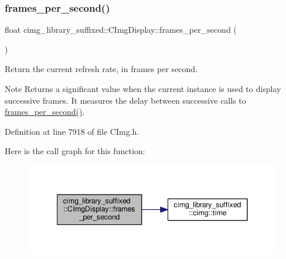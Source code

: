 \mbox{\label{structcimg__library__suffixed_1_1CImgDisplay_ac98fc29fc303ea835a630ab2253cb7b4}} 
\subsubsection{\texorpdfstring{frames\+\_\+per\+\_\+second()}{frames\_per\_second()}}
{\footnotesize\ttfamily float cimg\+\_\+library\+\_\+suffixed\+::\+C\+Img\+Display\+::frames\+\_\+per\+\_\+second (\begin{DoxyParamCaption}{ }\end{DoxyParamCaption})\hspace{0.3cm}{\ttfamily [inline]}}



Return the current refresh rate, in frames per second. 

\begin{DoxyNote}{Note}
Returns a significant value when the current instance is used to display successive frames. It measures the delay between successive calls to \hyperlink{structcimg__library__suffixed_1_1CImgDisplay_ac98fc29fc303ea835a630ab2253cb7b4}{frames\+\_\+per\+\_\+second()}. 
\end{DoxyNote}


Definition at line 7918 of file C\+Img.\+h.

Here is the call graph for this function\+:
\nopagebreak
\begin{figure}[H]
\begin{center}
\leavevmode
\includegraphics[width=341pt]{d5/d53/structcimg__library__suffixed_1_1CImgDisplay_ac98fc29fc303ea835a630ab2253cb7b4_cgraph}
\end{center}
\end{figure}
\mbox{\label{structcimg__library__suffixed_1_1CImgDisplay_a5604a6886d51d1070ed2ddc568a848f2}} 
